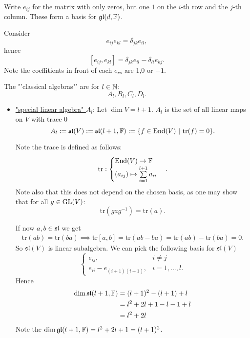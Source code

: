 \begin{remark}
    Write $e_{ij}$ for the matrix with only zeros, but one $1$ on the $i$-th row and the $j$-th column.
    These form a basis for $\mathfrak{gl}(d,\mathbb{F})$.

    Consider
    $$e_{ij} e_{kl} = \delta_{jk}e_{il}, $$ 
    hence
    $$[e_{ij}, e_{kl}] = \delta_{jk}e_{il} - \delta_{li} e_{kj}.$$
    Note the coeffitients in front of each $e_{rs}$ are 1,0 or  $-1$.
\end{remark}

\begin{example}
    The "'classical algebras"' are for $l \in \mathbb{N}$:
    $$A_l, B_l, C_l, D_l. $$

    \begin{itemize}[label=]
        \renewcommand{\sl}{\mathfrak{sl}}
        \newcommand{\tr}{\textrm{tr}}
        \item \underline{"special linear algebra" $A_l$}:
        Let $\dim V = l+1$. $A_l$ is the set of all linear maps on $V$ with trace 0
        $$ A_l := \sl(V) := \sl(l+1, \F) := \{f \in \textrm{End}(V) \| \tr(f) = 0\}.$$

        Note the trace is defined as follows:
        $$ \tr : \begin{cases}
            \End(V) \to \F \\
            (a_{ij}) \mapsto \sum\limits_{i=1}^{l+1} a_{ii}             
        \end{cases}. $$
        Note also that this does not depend on the chosen basis, 
        as one may show that for all $g \in \textrm{GL}(V)$:
        $$ \tr(gag^{-1}) = \tr(a). $$

        If now $a,b \in \sl$ we get
        \begin{align*}
            \tr(ab) = \tr(ba) \implies \tr [a,b] = \tr (ab - ba) = \tr(ab) - \tr(ba) = 0. 
        \end{align*}
        So $\sl(V)$ is linear subalgebra.
        We can pick the following basis for $\sl(V)$
        $$\begin{cases}
            e_{ij}, & i \ne j \\
            e_{ii} - e_{(i+1) (i+1)}, & i=1,...,l. 
        \end{cases}$$
        Hence
        \begin{align*}
            \dim \sl(l+1, \F) &= (l+1)^2 - (l+1) + l\\ 
                              &= l^2 +2l +1 -l -1 + l\\
                              &= l^2 +2l
        \end{align*}
        Note the $\dim \mathfrak{gl}(l+1,\mathbb{F}) = l^2 + 2l +1 = (l+1)^2 $.


\end{itemize}
\end{example}
